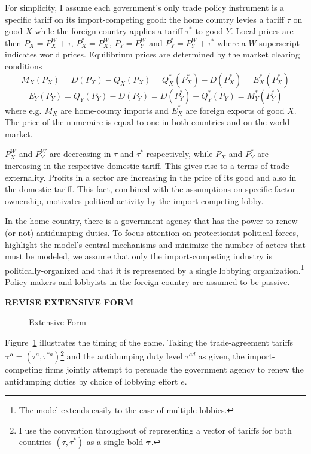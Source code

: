 \documentclass[10pt]{article}
\newcommand{\bta}{\bm{\tau^a}}
\newcommand{\tad}{\tau^{ad}}
\begin{document}
For simplicity, I assume each government's only trade policy instrument is a specific tariff on its import-competing good: the home country levies a tariff $\tau$ on good $X$ while the foreign country applies a tariff $\tau^*$ to good $Y$. Local prices are then $P_X = P_X^W + \tau$, $P_X^* = P_X^W$, $P_Y = P_Y^W$ and $P_Y^* = P_Y^W + \tau^*$ where a $W$ superscript indicates world prices. Equilibrium prices are determined by the market clearing conditions
$$M_X(P_X)= D(P_X)-Q_X(P_X) = Q_X^*(P_X^*) - D(P_X^*) = E_X^*(P_X^*)$$
$$E_Y(P_Y)=Q_Y(P_Y)-D(P_Y) = D(P_Y^*)-Q_Y^*(P_Y) = M_Y^*(P_Y^*)$$
where e.g. $M_X$ are home-county imports and $E_X^*$ are foreign exports of good $X$. The price of the numeraire is equal to one in both countries and on the world market.

$P_X^W$ and $P_Y^W$ are decreasing in $\tau$ and $\tau^*$ respectively, while $P_X$ and $P_Y^*$ are increasing in the respective domestic tariff. This gives rise to a terms-of-trade externality. Profits in a sector are increasing in the price of its good and also in the domestic tariff. This fact, combined with the assumptions on specific factor ownership, motivates political activity by the import-competing lobby.

In the home country, there is a government agency that has the power to renew (or not) antidumping duties. To focus attention on protectionist political forces, highlight the model's central mechanisms and minimize the number of actors that must be modeled, we assume that only the import-competing industry is politically-organized and that it is represented by a single lobbying organization.\footnote{The model extends easily to the case of multiple lobbies.\label{fn:lobby}} Policy-makers and lobbyists in the foreign country are assumed to be passive.

\textbf{REVISE EXTENSIVE FORM}

\begin{figure}
	\begin{center}
		
	\end{center}
	\caption{Extensive Form\label{fig:ext}}
\end{figure}

Figure~\ref{fig:ext} illustrates the timing of the game. Taking the trade-agreement tariffs $\bta = \left(\tau^a,\tau^{*a}\right)$\footnote{I use the convention throughout of representing a vector of tariffs for both countries $(\tau,\tau^*)$ as a single bold $\bm{\tau}$.} and the antidumping duty level $\tad$ as given, the import-competing firms jointly attempt to persuade the government agency to renew the antidumping duties by choice of lobbying effort $e$. 
\end{document}
